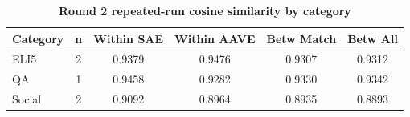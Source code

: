 \begin{table}[htbp]
\centering
\caption{\textbf{Round 2 repeated-run cosine similarity by category}}
\label{tab:round2-repeated-cosine-by-category}
\renewcommand{\arraystretch}{1.4}
\begin{tabular}{|l|c|c|c|c|c|}
\hline
\textbf{Category} & \textbf{n} & \textbf{Within SAE} & \textbf{Within AAVE} & \textbf{Betw Match} & \textbf{Betw All} \\
\hline
ELI5 & 2 & 0.9379 & 0.9476 & 0.9307 & 0.9312 \\
\hline
QA & 1 & 0.9458 & 0.9282 & 0.9330 & 0.9342 \\
\hline
Social & 2 & 0.9092 & 0.8964 & 0.8935 & 0.8893 \\
\hline
\end{tabular}
\end{table}

